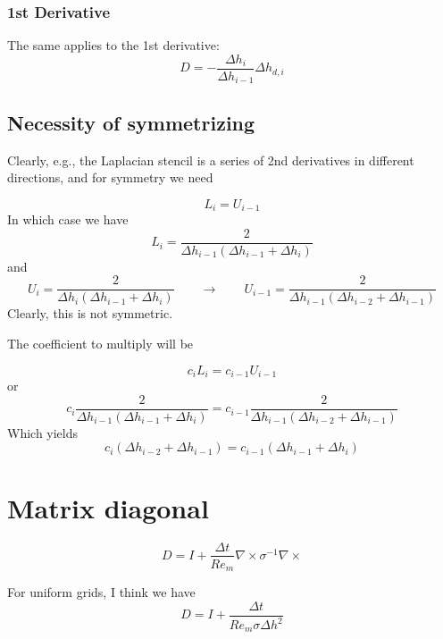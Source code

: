 \documentclass[landscape]{article}
\begin{document}
\subsubsection{1st Derivative}
The same applies to the 1st derivative:
\begin{equation}
   D = - \frac{\Delta h_{i}}{\Delta h_{i-1}} \Delta h_{d,i}
\end{equation}


\subsection{Necessity of symmetrizing}

Clearly, e.g., the Laplacian stencil is a series of 2nd derivatives in different directions, and for symmetry we need

\begin{equation}
  L_{i} = U_{i-1}
\end{equation}
In which case we have
\begin{equation}
  L_{i} = \frac{2}{\Delta h_{{i-1}} \left(\Delta h_{{i-1}} + \Delta h_{{i}}\right)}
\end{equation}
and
\begin{equation}
  U_{i} = \frac{2}{\Delta h_{{i}} \left(\Delta h_{{i-1}} + \Delta h_{{i}}\right)}
  \qquad \rightarrow
  \qquad
  U_{i-1} = \frac{2}{\Delta h_{{i-1}} \left(\Delta h_{{i-2}} + \Delta h_{{i-1}}\right)}
\end{equation}
Clearly, this is not symmetric.

The coefficient to multiply will be

\begin{equation}
  c_i L_{i} = c_{i-1} U_{i-1}
\end{equation}
or
\begin{equation}
  c_i \frac{2}{\Delta h_{{i-1}} \left(\Delta h_{{i-1}} + \Delta h_{{i}}\right)} =
  c_{i-1} \frac{2}{\Delta h_{{i-1}} \left(\Delta h_{{i-2}} + \Delta h_{{i-1}}\right)}
\end{equation}
Which yields
\begin{equation}
  c_i (\Delta h_{{i-2}} + \Delta h_{{i-1}}) = 
  c_{i-1} (\Delta h_{{i-1}} + \Delta h_{{i}}) 
\end{equation}

\section{Matrix diagonal}
\begin{equation}
  D = I + \frac{\Delta t}{Re_m} \nabla \times \sigma^{-1} \nabla \times
\end{equation}

For uniform grids, I think we have
\begin{equation}
  D = I + \frac{\Delta t}{Re_m \sigma \Delta h^2}
\end{equation}
\end{document}

